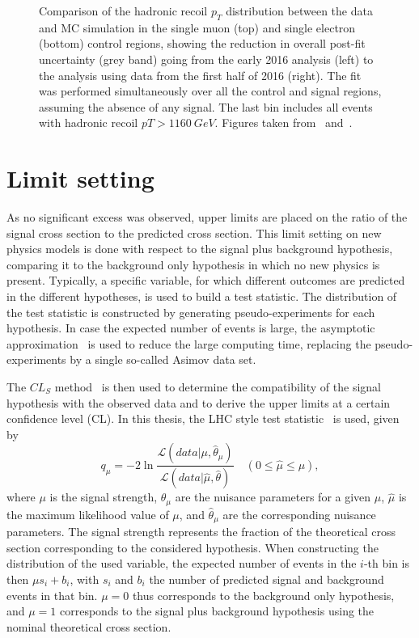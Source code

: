 \begin{figure}[p]
 \caption{Comparison of the hadronic recoil $p_T$ distribution between the data and MC simulation in the single muon (top) and single electron (bottom) control regions, showing the reduction in overall post-fit uncertainty (grey band) going from the early 2016 analysis (left) to the analysis using data from the first half of 2016 (right). The fit was performed simultaneously over all the control and signal regions, assuming the absence of any signal. The last bin includes all events with hadronic recoil $pT > \SI{1160}{GeV}$. Figures taken from~\cite{CMS:2016tns} and~\cite{Sirunyan:2017hci}.}
 \label{fig:comparison2}
\end{figure}

\section{Limit setting}
\label{sec:limits}

As no significant excess was observed, upper limits are placed on the ratio of the signal cross section to the predicted cross section. This limit setting on new physics models is done with respect to the signal plus background hypothesis, comparing it to the background only hypothesis in which no new physics is present. Typically, a specific variable, for which different outcomes are predicted in the different hypotheses, is used to build a test statistic. The distribution of the test statistic is constructed by generating pseudo-experiments for each hypothesis. In case the expected number of events is large, the asymptotic approximation~\cite{Cowan:2010js} is used to reduce the large computing time, replacing the pseudo-experiments by a single so-called Asimov data set.

The $CL_S$ method~\cite{CLS1,CLS2} is then used to determine the compatibility of the signal hypothesis with the observed data and to derive the upper limits at a certain confidence level (CL). In this thesis, the \ac{LHC} style test statistic~\cite{ATLAS:2011tau} is used, given by
\begin{equation}
 q_{\mu} = -2 \ln \frac{\mathcal{L}\left(data|\mu, \hat{\theta}_{\mu} \right)}{\mathcal{L}\left( data|\hat{\mu}, \hat{\theta} \right)} \quad \left(0 \leq \hat{\mu} \leq \mu\right),
\end{equation}
where $\mu$ is the signal strength, $\theta_{\mu}$ are the nuisance parameters for a given $\mu$, $\hat{\mu}$ is the maximum likelihood value of $\mu$, and $\hat{\theta}_{\mu}$ are the corresponding nuisance parameters. The signal strength represents the fraction of the theoretical cross section corresponding to the considered hypothesis. When constructing the distribution of the used variable, the expected number of events in the $i$-th bin is then $\mu s_i + b_i$, with $s_i$ and $b_i$ the number of predicted signal and background events in that bin. $\mu = 0$ thus corresponds to the background only hypothesis, and $\mu = 1$ corresponds to the signal plus background hypothesis using the nominal theoretical cross section.

